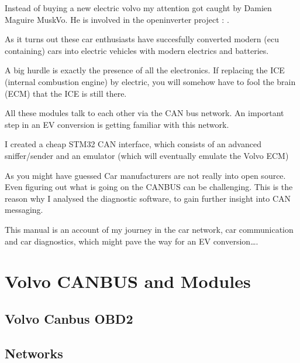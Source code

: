 \documentclass[letterpaper,10pt,english]{sphinxmanual}
\begin{document}
\sphinxAtStartPar
Instead of buying a new electric volvo my attention got caught by Damien Maguire MuskVo. He is involved in the openinverter project : .

\sphinxAtStartPar
As it turns out these car enthusiasts have succesfully converted modern (ecu containing) cars into electric vehicles with modern electrics and batteries.

\sphinxAtStartPar
A big hurdle is exactly the presence of all the electronics. If replacing the ICE (internal combustion engine) by electric, you will somehow have to fool the brain (ECM) that the ICE is still there.

\sphinxAtStartPar
All these modules talk to each other via the CAN bus network. An important step in an EV conversion is getting familiar with this network.

\sphinxAtStartPar
I created a cheap STM32 CAN interface, which consists of an advanced sniffer/sender and an emulator (which will eventually emulate the Volvo ECM)

\sphinxAtStartPar
As you might have guessed Car manufacturers are not really into open source. Even figuring out what is going on the CANBUS can be challenging. This is the reason why I analysed the diagnostic software, to gain further insight into CAN messaging.

\sphinxAtStartPar
This manual is an account of my journey in the car network, car communication and car diagnostics, which might pave the way for an EV conversion….


\chapter{Volvo CANBUS and Modules}
\label{\detokenize{canbus/index:volvo-canbus-and-modules}}\label{\detokenize{canbus/index::doc}}

\section{Volvo Canbus OBD2}
\label{\detokenize{canbus/volvo-canbus:volvo-canbus-obd2}}\label{\detokenize{canbus/volvo-canbus::doc}}
\noindent{}


\section{Networks}
\label{\detokenize{canbus/networks:networks}}\label{\detokenize{canbus/networks::doc}}
\noindent{}
\end{document}
